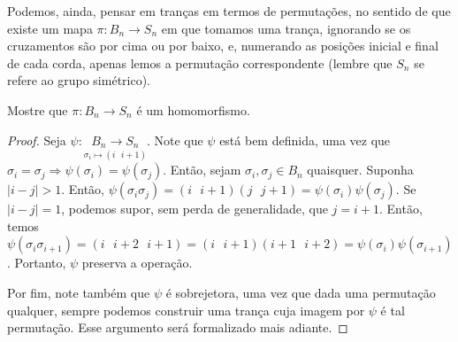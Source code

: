 	
	
	\par\vspace{0.3cm} Podemos, ainda, pensar em tranças em termos de permutações, no sentido de que existe um mapa $\pi: B_n\to S_n$ em que tomamos uma trança, ignorando se os cruzamentos são por cima ou por baixo, e, numerando as posições inicial e final de cada corda, apenas lemos a permutação correspondente (lembre que $S_n$ se refere ao grupo simétrico).
	
	\par\vspace{0.3cm}
	
	\begin{lemma}
		\label{B_n iso S_n}
		Mostre que $\pi: B_n\to S_n$ é um homomorfismo.
	\end{lemma}
	
	\begin{proof}
		Seja $\psi:\underset{\sigma_i\mapsto(i\text{ }i+1)}{B_n\to S_n}$. Note que $\psi$ está bem definida, uma vez que $\sigma_i=\sigma_j\Rightarrow\psi(\sigma_i)=\psi(\sigma_j)$. Então, sejam $\sigma_i,\sigma_j\in B_n$ quaisquer. Suponha $|i-j|>1$. Então, $\psi(\sigma_i\sigma_j)=(i\text{ } i+1)(j\text{ } j+1)=\psi(\sigma_i)\psi(\sigma_j)$. Se $|i-j|=1$, podemos supor, sem perda de generalidade, que $j=i+1$. Então, temos $\psi(\sigma_i\sigma_{i+1})=(i\text{ } i+2\text{ } i+1)=(i\text{ } i+1)(i+1\text{ } i+2)=\psi(\sigma_i)\psi(\sigma_{i+1})$. Portanto, $\psi$ preserva a operação. 
		\par\vspace{0.3cm} Por fim, note também que $\psi$ é sobrejetora, uma vez que dada uma permutação qualquer, sempre podemos construir uma trança cuja imagem por $\psi$ é tal permutação. Esse argumento será formalizado mais adiante.
	\end{proof}
	
	\par\vspace{0.3cm}
	
